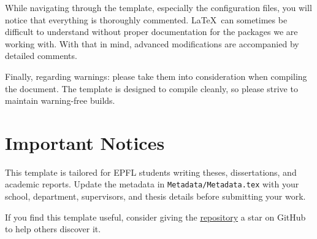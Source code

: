 While navigating through the template, especially the configuration files, you will notice that everything is thoroughly commented. \LaTeX~can sometimes be difficult to understand without proper documentation for the packages we are working with. With that in mind, advanced modifications are accompanied by detailed comments.

Finally, regarding warnings: please take them into consideration when compiling the document. The template is designed to compile cleanly, so please strive to maintain warning-free builds.

\section{Important Notices}
This template is tailored for EPFL students writing theses, dissertations, and academic reports. Update the metadata in \texttt{Metadata/Metadata.tex} with your school, department, supervisors, and thesis details before submitting your work.

If you find this template useful, consider giving the \href{https://github.com/pmdlt/epfl-thesis}{repository} a star on GitHub to help others discover it.
